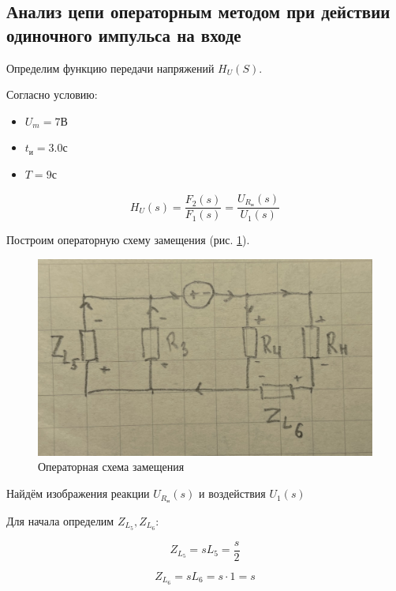 \subsection{Анализ цепи операторным методом при действии одиночного импульса на входе}

Определим функцию передачи напряжений $ H_U(S) $.

Согласно условию:

\begin{itemize}
    \item $ U_m = 7 В $
    \item $ t_и = 3.0 с $
    \item $ T = 9 с $
\end{itemize}

$$ H_U(s) = 
\dfrac{F_2(s)}{F_1(s)} = 
\dfrac{U_{R_н}(s)}{U_1(s)} $$

Построим операторную схему замещения 
(рис. \ref{fig:circ_replaced_operator}).

\begin{figure}[H]
    \centering
    \includegraphics[width=0.7\linewidth]{photo/circ_replaced_operator}
    \caption{Операторная схема замещения}
    \label{fig:circ_replaced_operator}
\end{figure}

Найдём изображения 
реакции $ U_{R_н}(s) $ и 
воздействия $ U_1(s) $

Для начала определим 
$ Z_{L_5}, Z_{L_6} $:

$$ Z_{L_5} = sL_5 = \dfrac{s}{2} $$

$$ Z_{L_6} = sL_6 = s \cdot 1 = s $$

